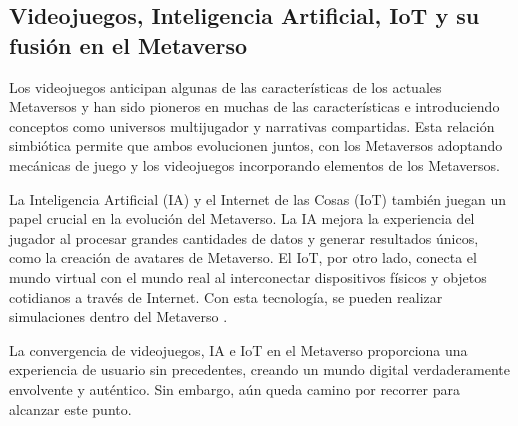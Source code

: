 \documentclass[a4paper,10pt]{article}
\begin{document}
	\subsection{Videojuegos, Inteligencia Artificial, IoT y su fusión en el Metaverso}
	{\normalsize Los videojuegos anticipan algunas de las características de los actuales Metaversos y han sido pioneros en muchas de las características e introduciendo conceptos como universos multijugador y narrativas compartidas. Esta relación simbiótica permite que ambos evolucionen juntos, con los Metaversos adoptando mecánicas de juego y los videojuegos incorporando elementos de los Metaversos.\par
		La Inteligencia Artificial (IA) y el Internet de las Cosas (IoT) también juegan un papel crucial en la evolución del Metaverso. La IA mejora la experiencia del jugador al procesar grandes cantidades de datos y generar resultados únicos, como la creación de avatares de Metaverso. El IoT, por otro lado, conecta el mundo virtual con el mundo real al interconectar dispositivos físicos y objetos cotidianos a través de Internet. Con esta tecnología, se pueden realizar simulaciones dentro del Metaverso \parencite{gonzalez2022metaverso}.\par
		La convergencia de videojuegos, IA e IoT en el Metaverso proporciona una experiencia de usuario sin precedentes, creando un mundo digital verdaderamente envolvente y auténtico. Sin embargo, aún queda camino por recorrer para alcanzar este punto.}
\end{document}
